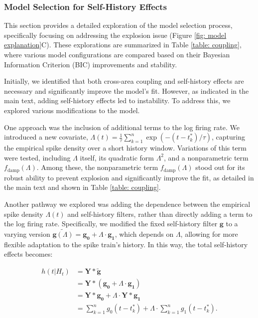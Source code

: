 \documentclass[12pt]{article}
\begin{document}




\subsubsection*{Model Selection for Self-History Effects}

This section provides a detailed exploration of the model selection process, specifically focusing on addressing the explosion issue (Figure \ref{fig: model explanation}C). These explorations are summarized in Table \ref{table: coupling}, where various model configurations are compared based on their Bayesian Information Criterion (BIC) improvements and stability.

Initially, we identified that both cross-area coupling and self-history effects are necessary and significantly improve the model's fit. However, as indicated in the main text, adding self-history effects led to instability. To address this, we explored various modifications to the model.

One approach was the inclusion of additional terms to the log firing rate. We introduced a new covariate, $\Lambda(t) = \frac{1}{\tau}\sum_{k=1}^n \exp(-(t-t_k^*)/\tau)$, capturing the empirical spike density over a short history window. Variations of this term were tested, including $\Lambda$ itself, its quadratic form $\Lambda^2$, and a nonparametric term $f_{\text{damp}}(\Lambda)$. Among these, the nonparametric term $f_{\text{damp}}(\Lambda)$ stood out for its robust ability to prevent explosion and significantly improve the fit, as detailed in the main text and shown in Table \ref{table: coupling}.

Another pathway we explored was adding the dependence between the empirical spike density $\Lambda(t)$ and self-history filters, rather than directly adding a term to the log firing rate. Specifically, we modified the fixed self-history filter $\mathbf{g}$ to a varying version $\tilde{\mathbf{g}(\Lambda)}=\mathbf{g_0} + \Lambda \cdot \mathbf{g_1}$, which depends on $\Lambda$, allowing for more flexible adaptation to the spike train's history. In this way, the total self-history effects becomes: 

\begin{align}
h(t | H_t)&=\mathbf{Y}*\tilde{\mathbf{g}}\\
&=\mathbf{Y}*(\mathbf{g_0} + \Lambda \cdot \mathbf{g_1}) \\
&=\mathbf{Y}*\mathbf{g_0} + \Lambda \cdot \mathbf{Y}*\mathbf{g_1} \\
&=\sum_{k=1}^n g_0(t-t_k^*) + \Lambda \cdot \sum_{k=1}^n g_1(t-t_k^*).
\end{align}
\end{document}
